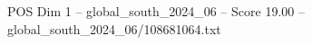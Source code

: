 \begin{textsample}{POS Dim 1 – global\_south\_2024\_06 – Score 19.00 – global\_south\_2024\_06/108681064.txt}
\end{textsample}
